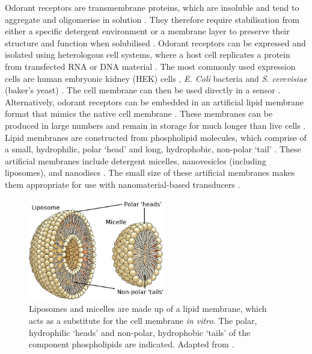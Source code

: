 \documentclass[
  a4paper,
]{scrbook}
\begin{document}
Odorant receptors are transmembrane proteins, which are insoluble and
tend to aggregate and oligomerise in solution \autocite{Nath2007}. They
therefore require stabilisation from either a specific detergent
environment or a membrane layer to preserve their structure and function
when solubilised \autocite{Fruh2011,Dung2018}. Odorant receptors can be
expressed and isolated using heterologous cell systems, where a host
cell replicates a protein from transfected RNA or DNA material
\autocite{Glatz2011,Dung2018}. The most commonly used expression cells
are human embryonic kidney (HEK) cells \autocite{Lim2014,Ahn2020},
\emph{E. Coli} bacteria \autocite{Yang2017,Yang2018} and \emph{S.
cerevisiae} (baker's yeast) \autocite{Bohbot2020}. The cell membrane can
then be used directly in a sensor \autocite{Dung2018}. Alternatively,
odorant receptors can be embedded in an artificial lipid membrane format
that mimics the native cell membrane \autocite{Nath2007}. These
membranes can be produced in large numbers and remain in storage for
much longer than live cells \autocite{Goldsmith2011,Lim2015}. Lipid
membranes are constructed from phospholipid molecules, which comprise of
a small, hydrophilic, polar `head' and long, hydrophobic, non-polar
`tail' \autocite{Bose2021,Ramadon2022}. These artificial membranes
include detergent micelles, nanovesicles (including liposomes), and
nanodiscs \autocite{Yang2018,Moon2020}. The small size of these
artificial membranes makes them appropriate for use with
nanomaterial-based transducers \autocite{Lim2015,Dung2018}.

\begin{figure}

{\centering \includegraphics[width=0.53\textwidth,height=\textheight]{figures/ch3/OSC_Microbio_07_03_micelle_edit.png}

}

\caption{\label{fig-micelle}Liposomes and micelles are made up of a
lipid membrane, which acts as a substitute for the cell membrane
\emph{in vitro}. The polar, hydrophilic `heads' and non-polar,
hydrophobic `tails' of the component phospholipids are indicated.
Adapted from \autocite{Micelle}.}

\end{figure}
\end{document}
